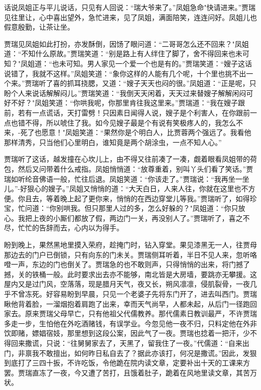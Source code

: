 话说凤姐正与平儿说话，只见有人回说：“瑞大爷来了。”凤姐急命"快请进来。”贾瑞见往里让，心中喜出望外，急忙进来，见了凤姐，满面陪笑，连连问好。凤姐儿也假意殷勤，让茶让坐。

贾瑞见凤姐如此打扮，亦发酥倒，因饧了眼问道：“二哥哥怎么还不回来？"凤姐道：“不知什么原故。”贾瑞笑道：“别是路上有人绊住了脚了，舍不得回来也未可知？"凤姐道：“也未可知。男人家见一个爱一个也是有的。”贾瑞笑道：“嫂子这话说错了，我就不这样。”凤姐笑道：“象你这样的人能有几个呢，十个里也挑不出一个来。”贾瑞听了喜的抓耳挠腮，又道：“嫂子天天也闷的很。”凤姐道：“正是呢，只盼个人来说话解解闷儿。”贾瑞笑道：“我倒天天闲着，天天过来替嫂子解解闲闷可好不好？"凤姐笑道：“你哄我呢，你那里肯往我这里来。”贾瑞道：“我在嫂子跟前，若有一点谎话，天打雷劈！只因素日闻得人说，嫂子是个利害人，在你跟前一点也错不得，所以唬住了我。如今见嫂子最是个有说有笑极疼人的，我怎么不来，-死了也愿意！"凤姐笑道：“果然你是个明白人，比贾蓉两个强远了。我看他那样清秀，只当他们心里明白，谁知竟是两个胡涂虫，一点不知人心。”

贾瑞听了这话，越发撞在心坎儿上，由不得又往前凑了一凑，觑着眼看凤姐带的荷包，然后又问带着什么戒指。凤姐悄悄道：“放尊重着，别叫丫头们看了笑话。”贾瑞如听纶音佛语一般，忙往后退。凤姐笑道：“你该走了。”贾瑞说：“我再坐一坐儿。”-好狠心的嫂子。”凤姐又悄悄的道：“大天白日，人来人往，你就在这里也不方便。你且去，等着晚上起了更你来，悄悄的在西边穿堂儿等我。”贾瑞听了，如得珍宝，忙问道：“你别哄我。但只那里人过的多，怎么好躲的？"凤姐道：“你只放心。我把上夜的小厮们都放了假，两边门一关，再没别人了。”贾瑞听了，喜之不尽，忙忙的告辞而去，心内以为得手。

盼到晚上，果然黑地里摸入荣府，趁掩门时，钻入穿堂。果见漆黑无一人，往贾母那边去的门户已倒锁，只有向东的门未关。贾瑞侧耳听着，半日不见人来，忽听咯噔一声，东边的门也倒关了。贾瑞急的也不敢则声，只得悄悄的出来，将门撼了撼，关的铁桶一般。此时要求出去亦不能够，南北皆是大房墙，要跳亦无攀援。这屋内又是过门风，空落落，现是腊月天气，夜又长，朔风凛凛，侵肌裂骨，一夜几乎不曾冻死。好容易盼到早晨，只见一个老婆子先将东门开了，进去叫西门。贾瑞瞅他背着脸，一溜烟抱着肩跑了出来，幸而天气尚早，人都未起，从后门一径跑回家去。原来贾瑞父母早亡，只有他祖父代儒教养。那代儒素日教训最严，不许贾瑞多走一步，生怕他在外吃酒赌钱，有误学业。今忽见他一夜不归，只料定他在外非饮即赌，嫖娼宿妓，那里想到这段公案，因此气了一夜。贾瑞也捻着一把汗，少不得回来撒谎，只说：“往舅舅家去了，天黑了，留我住了一夜。”代儒道：“自来出门，非禀我不敢擅出，如何昨日私自去了？据此亦该打，何况是撒谎。”因此，发狠到底打了三四十扳，不许吃饭，令他跪在院内读文章，定要补出十天的工课来方罢。贾瑞直冻了一夜，今又遭了苦打，且饿着肚子，跪着在风地里读文章，其苦万状。

